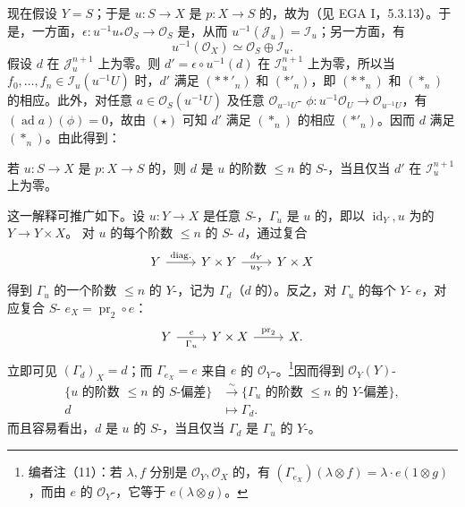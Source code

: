 现在假设 $Y=S$；于是 $u:S\to X$ 是 $p:X\to S$ 的，故为（见 EGA I，5.3.13）。于是，一方面，$\epsilon:u^{-1}u_*\mathcal O_S\to\mathcal O_S$ 是，从而 $u^{-1}(\mathcal J_u)=\mathcal I_u$；另一方面，有
\[
u^{-1}(\mathcal O_X)\simeq\mathcal O_S\oplus\mathcal I_u.\tag{$\star$}
\]
假设 $d$ 在 $\mathcal J_u^{n+1}$ 上为零。则 $d'=\epsilon\circ u^{-1}(d)$ 在 $\mathcal I_u^{n+1}$ 上为零，所以当 $f_0,\ldots,f_n\in\mathcal I_u(u^{-1}U)$ 时，$d'$ 满足 $({**}'_n)$ 和 $(*'_n)$，即 $(**_n)$ 和 $(*_n)$ 的相应。此外，对任意 $a\in\mathcal O_S(u^{-1}U)$ 及任意 $\mathcal O_{u^{-1}U}$- $\phi:u^{-1}\mathcal O_U\to\mathcal O_{u^{-1}U}$，有 $(\operatorname{ad}a)(\phi)=0$，故由 $(\star)$ 可知 $d'$ 满足 $(*_n)$ 的相应 $(*'_n)$。因而 $d$ 满足 $(*_n)$。由此得到：
\begin{SGAresult}{}{}
若 $u:S\to X$ 是 $p:X\to S$ 的，则 $d$ 是 $u$ 的阶数 $\leq n$ 的 $S$-，当且仅当 $d'$ 在 $\mathcal I_u^{n+1}$ 上为零。
\end{SGAresult}
这一解释可推广如下。设 $u:Y\to X$ 是任意 $S$-，$\Gamma_u$ 是 $u$ 的，即以 $\operatorname{id}_Y,u$ 为的 $Y\to Y\times X$。
对 $u$ 的每个阶数 $\leq n$ 的 $S$- $d$，通过复合
\[
\begin{tikzcd}Y\arrow[r,"\mathrm{diag.}"]&Y\times Y\arrow[r,"d_Y","u_Y"']&Y\times X\end{tikzcd}
\]
得到 $\Gamma_u$ 的一个阶数 $\leq n$ 的 $Y$-，记为 $\Gamma_d$（$d$ 的）。反之，对 $\Gamma_u$ 的每个 $Y$- $e$，对应复合 $S$- $e_X=\operatorname{pr}_2\circ e$：
\[
\begin{tikzcd}Y\arrow[r,"e","\Gamma_u"']&Y\times X\arrow[r,"\operatorname{pr}_2"]&X.\end{tikzcd}
\]
立即可见 $(\Gamma_d)_X=d$；而 $\Gamma_{e_X}=e$ 来自 $e$ 的 $\mathcal O_Y$-。\footnote{编者注（11）：若 $\lambda,f$ 分别是 $\mathcal O_Y,\mathcal O_X$ 的，有 $(\Gamma_{e_X})(\lambda\otimes f)=\lambda\cdot e(1\otimes g)$，而由 $e$ 的 $\mathcal O_Y$-，它等于 $e(\lambda\otimes g)$。}因而得到 $\mathcal O_Y(Y)$-
\[
\begin{aligned}
\{u\text{ 的阶数 }\leq n\text{ 的 }S\text{-偏差}\}&\xrightarrow{\sim}\{\Gamma_u\text{ 的阶数 }\leq n\text{ 的 }Y\text{-偏差}\},\\
d&\longmapsto\Gamma_d.
\end{aligned}
\]
而且容易看出，$d$ 是 $u$ 的 $S$-，当且仅当 $\Gamma_d$ 是 $\Gamma_u$ 的 $Y$-。

